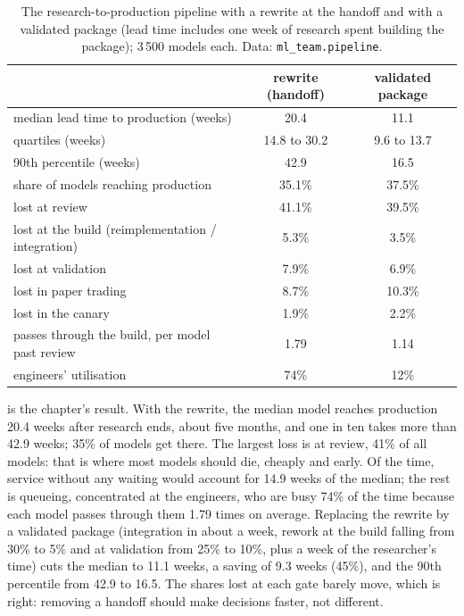 \begin{table}[htbp]
\centering\small
\begin{tabular}{@{}lcc@{}}
\toprule
 & rewrite (handoff) & validated package\\
\midrule
median lead time to production (weeks) & 20.4 & 11.1\\
quartiles (weeks) & 14.8 to 30.2 & 9.6 to 13.7\\
90th percentile (weeks) & 42.9 & 16.5\\
share of models reaching production & 35.1\% & 37.5\%\\
lost at review & 41.1\% & 39.5\%\\
lost at the build (reimplementation / integration) & 5.3\% & 3.5\%\\
lost at validation & 7.9\% & 6.9\%\\
lost in paper trading & 8.7\% & 10.3\%\\
lost in the canary & 1.9\% & 2.2\%\\
passes through the build, per model past review & 1.79 & 1.14\\
engineers' utilisation & 74\% & 12\%\\
\bottomrule
\end{tabular}
\caption{The research-to-production pipeline with a rewrite at the handoff and with a validated package (lead time includes one
week of research spent building the package); 3\,500 models each. Data: \texttt{ml\_team.pipeline}.}\label{tab:ml:team:pipeline}
\end{table}

 is the chapter's result. With the rewrite, the median model reaches production 20.4 weeks after
research ends, about five months, and one in ten takes more than 42.9 weeks; 35\% of models get there. The largest loss is at
review, 41\% of all models: that is where most models should die, cheaply and early. Of the time, service without any waiting
would account for 14.9 weeks of the median; the rest is queueing, concentrated at the engineers, who are busy 74\% of the time
because each model passes through them 1.79 times on average. Replacing the rewrite by a validated package (integration in about
a week, rework at the build falling from 30\% to 5\% and at validation from 25\% to 10\%, plus a week of the researcher's time)
cuts the median to 11.1 weeks, a saving of 9.3 weeks (45\%), and the 90th percentile from 42.9 to 16.5. The shares lost at each
gate barely move, which is right: removing a handoff should make decisions faster, not different.

